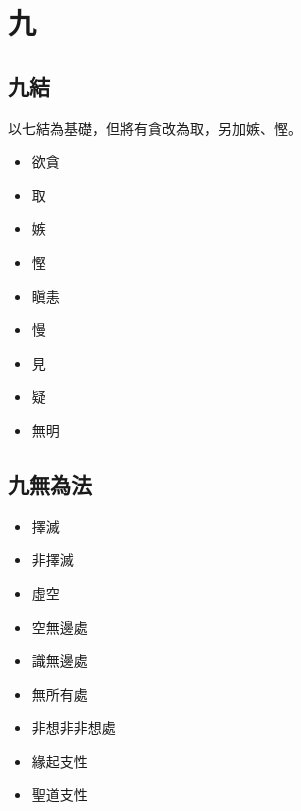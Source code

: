 \section{九}

\subsection{九結}
以七結為基礎，但將有貪改為取，另加嫉、慳。
\begin{itemize}
  \item 欲貪
  \item 取
  \item 嫉
  \item 慳
  \item 瞋恚
  \item 慢
  \item 見
  \item 疑
  \item 無明
\end{itemize}

\subsection{九無為法}
\begin{itemize}
  \item 擇滅
  \item 非擇滅
  \item 虛空
  \item 空無邊處
  \item 識無邊處
  \item 無所有處
  \item 非想非非想處
  \item 緣起支性
  \item 聖道支性
\end{itemize}
